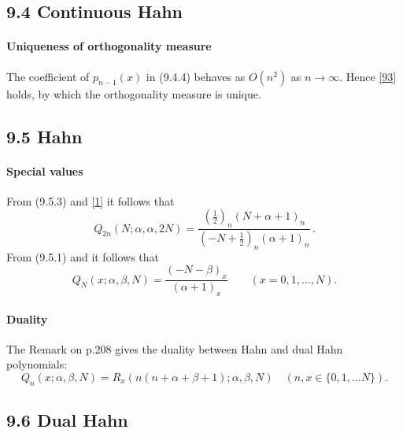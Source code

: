 \documentclass[twoside,11pt]{article}
\newcommand\al\alpha
\newcommand\be\beta
\newcommand\thalf{\tfrac12}
\newcommand\iy\infty
\begin{document}
\subsection*{9.4 Continuous Hahn}
%
\paragraph{Uniqueness of orthogonality measure}
The coefficient of $p_{n-1}(x)$ in (9.4.4) behaves as $O(n^2)$ as $n\to\iy$.
Hence \eqref{93} holds, by which the orthogonality measure is unique.
%
\subsection*{9.5 Hahn}
%
\paragraph{Special values}
From (9.5.3) and \eqref{1} it follows that
\begin{equation}
Q_{2n}(N;\al,\al,2N)=\frac{(\thalf)_n(N+\al+1)_n}{(-N+\thalf)_n(\al+1)_n}\,.
\label{30}
\end{equation}
From (9.5.1) and \cite[(15.4.24)]{DLMF} it follows that
\begin{equation}
Q_N(x;\al,\be,N)=\frac{(-N-\be)_x}{(\al+1)_x}\qquad(x=0,1,\ldots,N).
\label{44}
\end{equation}
%
\paragraph{Duality}
The Remark on p.208 gives the duality between Hahn and dual Hahn polynomials:
%
\begin{equation}
Q_n(x;\al,\be,N)=R_x(n(n+\al+\be+1);\al,\be,N)\quad(n,x\in\{0,1,\ldots N\}).
\label{45}
\end{equation}
%
\subsection*{9.6 Dual Hahn}
%
\end{document}
